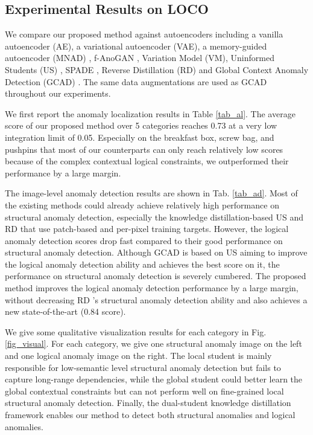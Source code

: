 \documentclass[10pt,twocolumn,letterpaper]{article}
\begin{document}
\subsection{Experimental Results on LOCO}
We compare our proposed method against autoencoders including a vanilla autoencoder (AE), a variational autoencoder (VAE), a memory-guided autoencoder (MNAD) \cite{park2020learning}, f-AnoGAN \cite{schlegl2019f}, Variation Model (VM)\cite{steger2018machine}, Uninformed Students (US) \cite{bergmann2020uninformed}, SPADE \cite{cohen2020sub}, Reverse Distillation (RD) \cite{deng2022anomaly} and Global Context Anomaly Detection (GCAD) \cite{bergmann2022beyond}. The same data augmentations are used as GCAD \cite{bergmann2022beyond} throughout our experiments. 

We first report the anomaly localization results in Table \ref{tab_al}. The average score of our proposed method over 5 categories reaches 0.73 at a very low integration limit of 0.05. Especially on the breakfast box, screw bag, and pushpins that most of our counterparts can only reach relatively low scores because of the complex contextual logical constraints, we outperformed their performance by a large margin.


The image-level anomaly detection results are shown in Tab. \ref{tab_ad}. Most of the existing methods could already achieve relatively high performance on structural anomaly detection, especially the knowledge distillation-based US \cite{bergmann2020uninformed} and RD \cite{deng2022anomaly} that use patch-based and per-pixel training targets. However, the logical anomaly detection scores drop fast compared to their good performance on structural anomaly detection. Although GCAD \cite{bergmann2022beyond} is based on US \cite{bergmann2020uninformed} aiming to improve the logical anomaly detection ability and achieves the best score on it, the performance on structural anomaly detection is severely cumbered. The proposed method improves the logical anomaly detection performance by a large margin, without decreasing RD \cite{deng2022anomaly} 's structural anomaly detection ability and also achieves a new state-of-the-art (0.84 score).


We give some qualitative visualization results for each category in Fig. \ref{fig_visual}. For each category, we give one structural anomaly image on the left and one logical anomaly image on the right. The local student is mainly responsible for low-semantic level structural anomaly detection but fails to capture long-range dependencies, while the global student could better learn the global contextual constraints but can not perform well on fine-grained local structural anomaly detection. Finally, the dual-student knowledge distillation framework enables our method to detect both structural anomalies and logical anomalies.
\end{document}
